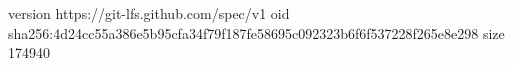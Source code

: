 version https://git-lfs.github.com/spec/v1
oid sha256:4d24cc55a386e5b95cfa34f79f187fe58695c092323b6f6f537228f265e8e298
size 174940
